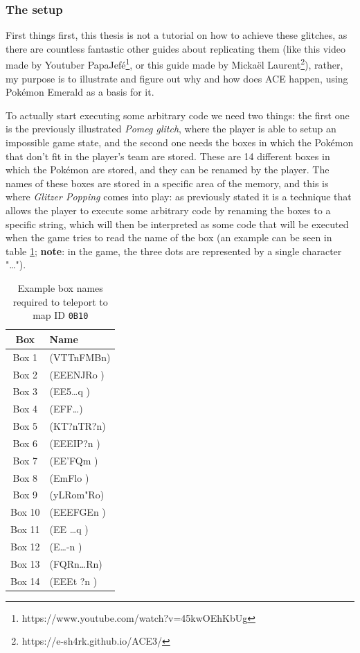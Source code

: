 \documentclass[a4paper]{usiinfbachelorproject}
\begin{document}
\subsubsection{The setup}
\label{sec:setup}
First things first, this thesis is not a tutorial on how to achieve these glitches, as there are countless fantastic other guides about replicating them (like this video made by Youtuber PapaJefé\footnote{https://www.youtube.com/watch?v=45kwOEhKbUg}, or this guide made by Mickaël Laurent\footnote{https://e-sh4rk.github.io/ACE3/}), rather, my purpose is to illustrate and figure out why and how does ACE happen, using Pokémon Emerald as a basis for it.

To actually start executing some arbitrary code we need two things: the first one is the previously illustrated \textit{Pomeg glitch}, where the player is able to setup an impossible game state, and the second one needs the boxes in which the Pokémon that don't fit in the player's team are stored. These are 14 different boxes in which the Pokémon are stored, and they can be renamed by the player. The names of these boxes are stored in a specific area of the memory, and this is where \textit{Glitzer Popping} comes into play: as previously stated it is a technique that allows the player to execute some arbitrary code by renaming the boxes to a specific string, which will then be interpreted as some code that will be executed when the game tries to read the name of the box (an example can be seen in table \ref{tab:boxes_names}; \textbf{note}: in the game, the three dots are represented by a single character "\dots").

\begin{table}[h!]
	\centering
	\begin{tabular}{|c|l|}
		\hline
		\textbf{Box} & \textbf{Name}  \\
		\hline
		Box 1        & (VTTnFMBn)     \\
		Box 2        & (EEENJRo )     \\
		Box 3        & (EE5\dots q  ) \\
		Box 4        & (EFF\dots    ) \\
		Box 5        & (KT?nTR?n)     \\
		Box 6        & (EEEIP?n )     \\
		Box 7        & (EE'FQm  )     \\
		Box 8        & (EmFlo   )     \\
		Box 9        & (yLRom"Ro)     \\
		Box 10       & (EEEFGEn )     \\
		Box 11       & (EE \dots q  ) \\
		Box 12       & (E\dots -n   ) \\
		Box 13       & (FQRn\dots Rn) \\
		Box 14       & (EEEt ?n )     \\
		\hline
	\end{tabular}
	\caption{Example box names required to teleport to map ID \texttt{0B10}}
	\label{tab:boxes_names}
\end{table}
\end{document}
